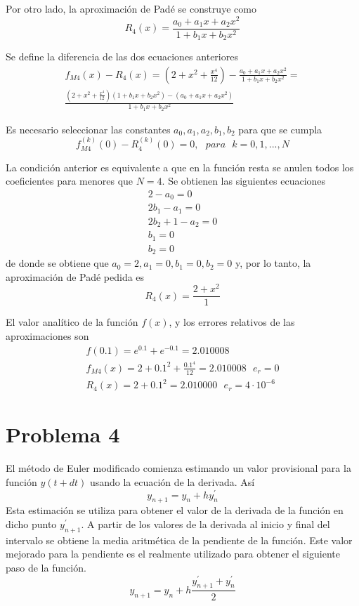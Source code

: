 \documentclass[a4paper, 12pt]{article}
\begin{document}
Por otro lado, la aproximación de Padé se construye como
\begin{equation*}
R_4(x) = \frac{a_0 + a_1x + a_2x^2}{1 + b_1x + b_2x^2}
\end{equation*} 

Se define la diferencia de las dos ecuaciones anteriores
\begin{align*}
f_{M4}(x) - R_4(x) = (2 + x^2 + \frac{x^4}{12}) -
                    \frac{a_0 + a_1x + a_2x^2}{1 + b_1x + b_2x^2} =\\
                    \frac{(2 + x^2 + \frac{x^4}{12})(1 + b_1x + b_2x^2) - (a_0 + a_1x + a_2x^2)}{1 + b_1x + b_2x^2}
\end{align*}

Es necesario seleccionar las constantes $a_0, a_1, a_2, b_1, b_2$ para que se
cumpla
\begin{equation*}
 f_{M4}^{(k)}(0) - R_4^{(k)}(0) = 0, ~~~para~~~k = 0, 1, ..., N
\end{equation*}

La condición anterior es equivalente a que en la función resta se anulen todos
los coeficientes para menores que $N=4$. Se obtienen las siguientes ecuaciones
\begin{align*}
2 - a_0 = 0\\
2b_1 - a_1 = 0\\
2b_2 + 1 - a_2 = 0\\
b_1 = 0\\
b_2 = 0
\end{align*}
de donde se obtiene que $a_0 = 2, a_1 = 0, b_1 = 0, b_2 = 0$ y, por lo tanto,
la aproximación de Padé pedida es
\begin{equation*}
R_4(x) = \frac{2 + x^2}{1}
\end{equation*}

El valor analítico de la función $f(x)$, y los errores relativos de las
aproximaciones son
\begin{align*}
f(0.1) = e^{0.1} + e^{-0.1} = 2.010008\\
f_{M4}(x) = 2 + 0.1^2 + \frac{0.1^4}{12} = 2.010008~~~e_r=0\\
R_4(x) = 2 + 0.1^2 = 2.010000~~~e_r = 4 \cdot 10^{-6}
\end{align*}

\section*{Problema 4}
El método de Euler modificado comienza estimando un valor provisional para la
función $y(t+dt)$ usando la ecuación de la derivada. Así
\begin{equation*}
 y_{n+1} = y_n + hy^{'}_n
\end{equation*}  
Esta estimación se utiliza para obtener el valor de la derivada de la función
en dicho punto $y^{'}_{n+1}$. A partir de los valores de la derivada al inicio
y final del intervalo se obtiene la media aritmética de la pendiente de la
función. Este valor mejorado para la pendiente es el realmente utilizado para
obtener el siguiente paso de la función.
\begin{equation*}
y_{n+1} = y_n + h\frac{y^{'}_{n+1} + y^{'}_{n}}{2}
\end{equation*}
\end{document}
